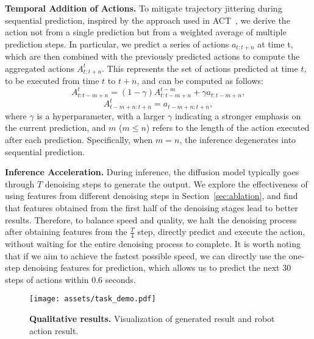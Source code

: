 \vspace{0.1cm}
\noindent\textbf{Temporal Addition of Actions.}
To mitigate trajectory jittering during sequential prediction, inspired by the approach used in ACT~\cite{zhao2023learning}, we derive the action not from a single prediction but from a weighted average of multiple prediction steps. In particular, we predict a series of actions $a_{t:t+n}$ at time t, which are then combined with the previously predicted actions to compute the aggregated actions $A_{t:t+n}^{t}$. This represents the set of actions predicted at time $t$, to be executed from time $t$ to $t+n$, and can be computed as follows:
\begin{equation}
A_{t:t-m+n}^{t} = (1-\gamma) A_{t:t-m+n}^{t-m} + \gamma a_{t:t-m+n},
\end{equation}
\begin{equation}    
A_{t-m+n:t+n}^{t}=a_{t-m+n:t+n},
\end{equation}
where $\gamma$ is a hyperparameter, with a larger $\gamma$ indicating a stronger emphasis on the current prediction, and $m$ ($m\leq n$) refers to the length of the action executed after each prediction. Specifically, when $m=n$, the inference degenerates into sequential prediction.
\vspace{0.1cm}

\noindent\textbf{Inference Acceleration.}
During inference, the diffusion model typically goes through $T$ denoising steps to generate the output. We explore the effectiveness of using features from different denoising steps in Section~\ref{sec:ablation}, and find that features obtained from the first half of the denoising stages lead to better results. Therefore, to balance speed and quality, we halt the denoising process after obtaining features from the $\frac{T}{4}$ step, directly predict and execute the action, without waiting for the entire denoising process to complete. It is worth noting that if we aim to achieve the fastest possible speed, we can directly use the one-step denoising features for prediction, which allows us to predict the next 30 steps of actions within 0.6 seconds.

\begin{figure*}[t]
\centering
\texttt{[image: assets/task\_demo.pdf]}
\vspace{-1.6em}
\caption{\textbf{Qualitative results.} Visualization of generated result and robot action result.}
\vspace{-1em}
\label{fig:task_demo}
\end{figure*}
